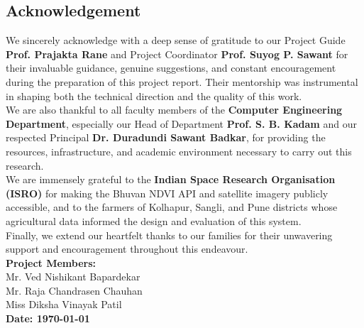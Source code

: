 \begin{center}
    \chapter*{Acknowledgement}
\end{center}


\vspace{0.3cm}
\hspace*{0.6cm} We sincerely acknowledge with a deep sense of gratitude to our Project Guide \textbf{Prof. Prajakta Rane} and Project Coordinator \textbf{Prof. Suyog P. Sawant} for their invaluable guidance, genuine suggestions, and constant encouragement during the preparation of this project report. Their mentorship was instrumental in shaping both the technical direction and the quality of this work.
\\
\hspace*{0.6cm}
We are also thankful to all faculty members of the \textbf{Computer Engineering Department}, especially our Head of Department \textbf{Prof. S. B. Kadam} and our respected Principal \textbf{Dr. Duradundi Sawant Badkar}, for providing the resources, infrastructure, and academic environment necessary to carry out this research.
\\
\hspace*{0.6cm}
We are immensely grateful to the \textbf{Indian Space Research Organisation (ISRO)} for making the Bhuvan NDVI API and satellite imagery publicly accessible, and to the farmers of Kolhapur, Sangli, and Pune districts whose agricultural data informed the design and evaluation of this system.
\\
\hspace*{0.6cm}
Finally, we extend our heartfelt thanks to our families for their unwavering support and encouragement throughout this endeavour.
\\[0.4cm]
\textbf{Project Members:}\\
Mr. Ved Nishikant Bapardekar\\
Mr. Raja Chandrasen Chauhan\\
Miss Diksha Vinayak Patil
\\[0.3cm]
\textbf{Date: \today}
